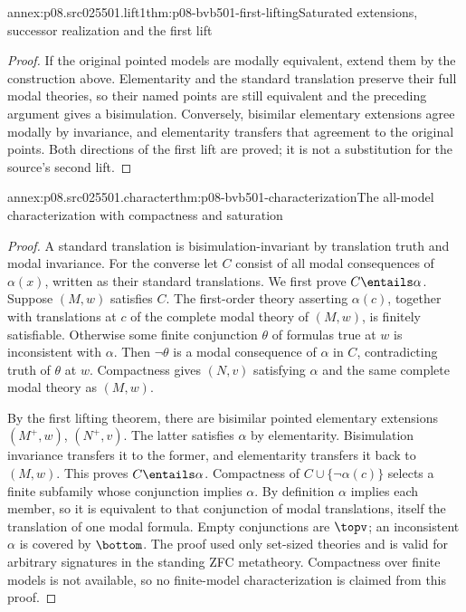 \begin{annexitem}{annex:p08.src025501.lift1}{thm:p08-bvb501-first-lifting}{Saturated extensions, successor realization and the first lift}
\begin{proof}
If the original pointed models are modally equivalent, extend them by the
construction above. Elementarity and the standard translation preserve
their full modal theories, so their named points are still equivalent and
the preceding argument gives a bisimulation. Conversely, bisimilar
elementary extensions agree modally by invariance, and elementarity transfers
that agreement to the original points. Both directions of the first lift
are proved; it is not a substitution for the source's second lift.
\end{proof}
\end{annexitem}

\begin{annexitem}{annex:p08.src025501.character}{thm:p08-bvb501-characterization}{The all-model characterization with compactness and saturation}
\begin{proof}
A standard translation is bisimulation-invariant by translation truth
and modal invariance. For the converse let \(C\) consist of all modal
consequences of \(\alpha(x)\), written as their standard translations.
We first prove \(C\entails\alpha\). Suppose \((M,w)\) satisfies
\(C\). The first-order theory asserting \(\alpha(c)\), together
with translations at \(c\) of the complete modal theory of \((M,w)\),
is finitely satisfiable. Otherwise some finite conjunction \(\theta\)
of formulas true at \(w\) is inconsistent with \(\alpha\).
Then \(\neg\theta\) is a modal consequence of \(\alpha\) in
\(C\), contradicting truth of \(\theta\) at \(w\).
Compactness gives \((N,v)\) satisfying \(\alpha\) and the same
complete modal theory as \((M,w)\).

By the first lifting theorem, there are bisimilar pointed elementary
extensions \((M^+,w)\), \((N^+,v)\). The latter satisfies
\(\alpha\) by elementarity. Bisimulation invariance transfers it to
the former, and elementarity transfers it back to \((M,w)\).
This proves \(C\entails\alpha\). Compactness of
\(C\cup\{\neg\alpha(c)\}\) selects a finite subfamily whose
conjunction implies \(\alpha\). By definition \(\alpha\) implies
each member, so it is equivalent to that conjunction of modal translations,
itself the translation of one modal formula. Empty conjunctions are
\(\topv\); an inconsistent \(\alpha\) is covered by \(\bottom\).
The proof used only set-sized theories and is valid for arbitrary signatures
in the standing ZFC metatheory. Compactness over finite models is not
available, so no finite-model characterization is claimed from this proof.
\end{proof}
\end{annexitem}

